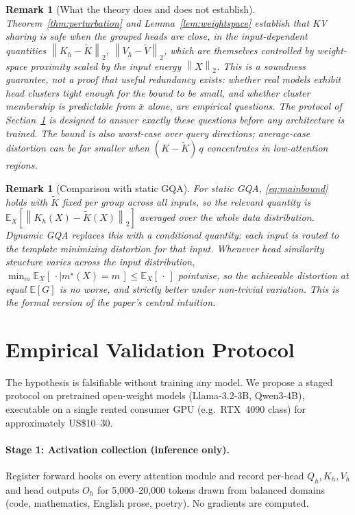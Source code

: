\documentclass{article}
\newtheorem{remark}[theorem]{Remark}
\newcommand{\E}{\mathbb{E}}
\newcommand{\opnorm}[1]{\left\lVert #1 \right\rVert_{2}}
\begin{document}
\begin{remark}[What the theory does and does not establish]
\label{rem:honest}
Theorem~\ref{thm:perturbation} and Lemma~\ref{lem:weightspace} establish
that KV sharing is \emph{safe when the grouped heads are close}, in the
input-dependent quantities $\opnorm{K_h - \tilde K}$, $\opnorm{V_h - \tilde V}$,
which are themselves controlled by weight-space proximity scaled by the
input energy $\opnorm{X}$. This is a soundness guarantee, not a proof that
useful redundancy exists: whether real models exhibit head clusters tight
enough for the bound to be small, and whether cluster membership is
predictable from $\bar x$ alone, are empirical questions. The protocol of
Section~\ref{sec:experiments} is designed to answer exactly these questions
before any architecture is trained. The bound is also worst-case over query
directions; average-case distortion can be far smaller when
$(K - \tilde K)\,q$ concentrates in low-attention regions.
\end{remark}

\begin{remark}[Comparison with static GQA]
For static GQA, \eqref{eq:mainbound} holds with $\tilde K$ fixed per group
across all inputs, so the relevant quantity is
$\E_{X}[\opnorm{K_h(X) - \tilde K(X)}]$ averaged over the \emph{whole} data
distribution. Dynamic GQA replaces this with a conditional quantity:
each input is routed to the template minimizing distortion \emph{for that
input}. Whenever head similarity structure varies across the input
distribution, $\min_m \E_X[\,\cdot \mid m^\star(X) = m\,] \le \E_X[\,\cdot\,]$
pointwise, so the achievable distortion at equal $\E[G]$ is no worse, and
strictly better under non-trivial variation. This is the formal version of
the paper's central intuition.
\end{remark}

\section{Empirical Validation Protocol}
\label{sec:experiments}

The hypothesis is falsifiable without training any model. We propose a
staged protocol on pretrained open-weight models
(Llama-3.2-3B, Qwen3-4B), executable on a single rented consumer GPU
(e.g.\ RTX~4090 class) for approximately US\$10--30.

\paragraph{Stage 1: Activation collection (inference only).}
Register forward hooks on every attention module and record per-head
$Q_h, K_h, V_h$ and head outputs $O_h$ for 5{,}000--20{,}000 tokens drawn
from balanced domains (code, mathematics, English prose, poetry). No
gradients are computed.
\end{document}
